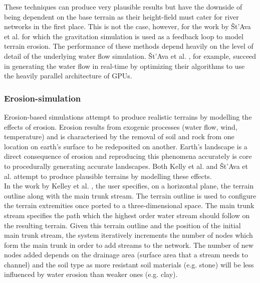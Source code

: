 These techniques can produce very plausible results but have the downside of being dependent on the base terrain as their height-field must cater for river networks in the first place. This is not the case, however, for the work by Št'Ava et al. \cite{StAva2008} for which the gravitation simulation is used as a feedback loop to model terrain erosion. The performance of these methods depend heavily on the level of detail of the underlying water flow simulation. Št'Ava et al. \cite{StAva2008}, for example, succeed in generating the water flow in real-time by optimizing their algorithms to use the heavily parallel architecture of GPUs.

\subsubsection{Erosion-simulation}

Erosion-based simulations attempt to produce realistic terrains by modelling the effects of erosion. Erosion results from exogenic processes (water flow, wind, temperature) and is characterised by the removal of soil and rock from one location on earth's surface to be redeposited on another. Earth's landscape is a direct consequence of erosion and reproducing this phenomena accurately is core to procedurally generating accurate landscapes. Both Kelly et al. \cite{Kelley1988} and Št'Ava et al. \cite{StAva2008} attempt to produce plausible terrains by modelling these effects.\\

In the work by Kelley et al. \cite{Kelley1988}, the user specifies, on a horizontal plane, the terrain outline along with the main trunk stream. The terrain outline is used to configure the terrain extremities once ported to a three-dimensional space. The main trunk stream specifies the path which the highest order water stream should follow on the resulting terrain. Given this terrain outline and the position of the initial main trunk stream, the system iteratively increments the number of nodes which form the main trunk in order to add streams to the network. The number of new nodes added depends on the drainage area (surface area that a stream needs to channel) and the soil type as more resistant soil materials (e.g. stone) will be less influenced by water erosion than weaker ones (e.g. clay). \\

